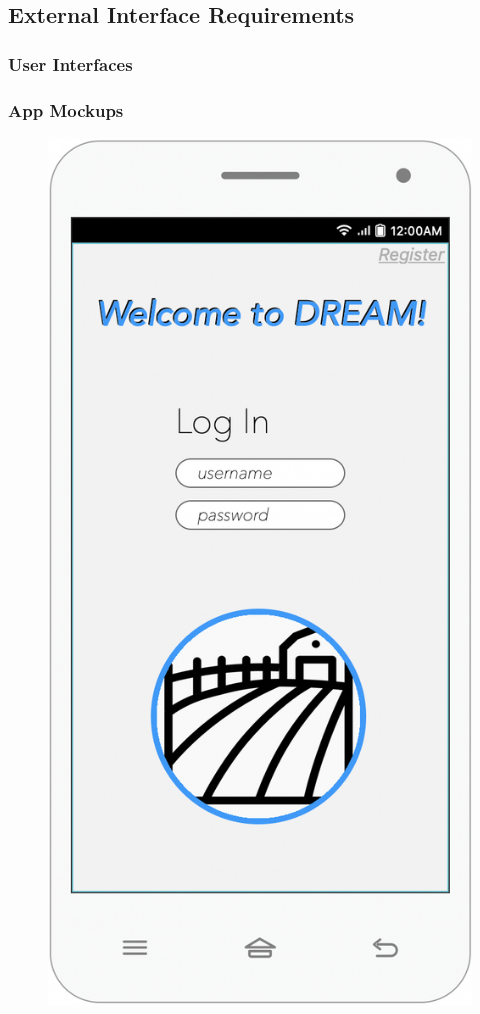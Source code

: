 \subsection{External Interface Requirements}

\subsubsection{User Interfaces}
\subsubsection{App Mockups}


\begin{multicols}{3}
\begin{figure}[H]
\centering
\includegraphics[scale=0.35]{../images_diagrams/mock_ups/login100.png}

\end{figure}
\end{multicols}
